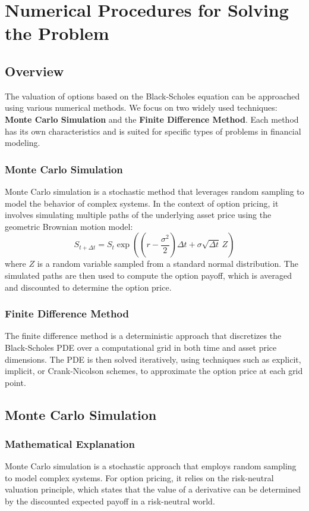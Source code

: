 \documentclass[12pt,a4paper]{report}
\begin{document}
\chapter{Numerical Procedures for Solving the Problem}

\section{Overview}
The valuation of options based on the Black-Scholes equation can be approached using various numerical methods. We focus on two widely used techniques: \textbf{Monte Carlo Simulation} and the \textbf{Finite Difference Method}. Each method has its own characteristics and is suited for specific types of problems in financial modeling.

\subsection{Monte Carlo Simulation}
Monte Carlo simulation is a stochastic method that leverages random sampling to model the behavior of complex systems. In the context of option pricing, it involves simulating multiple paths of the underlying asset price using the geometric Brownian motion model:
\[
S_{t+\Delta t} = S_t \exp \left( \left(r - \frac{\sigma^2}{2}\right)\Delta t + \sigma \sqrt{\Delta t} \, Z \right)
\]
where \(Z\) is a random variable sampled from a standard normal distribution. The simulated paths are then used to compute the option payoff, which is averaged and discounted to determine the option price.

\subsection{Finite Difference Method}
The finite difference method is a deterministic approach that discretizes the Black-Scholes PDE over a computational grid in both time and asset price dimensions. The PDE is then solved iteratively, using techniques such as explicit, implicit, or Crank-Nicolson schemes, to approximate the option price at each grid point.


\section{Monte Carlo Simulation}

\subsection{Mathematical Explanation}
Monte Carlo simulation is a stochastic approach that employs random sampling to model complex systems. For option pricing, it relies on the risk-neutral valuation principle, which states that the value of a derivative can be determined by the discounted expected payoff in a risk-neutral world.
\end{document}
